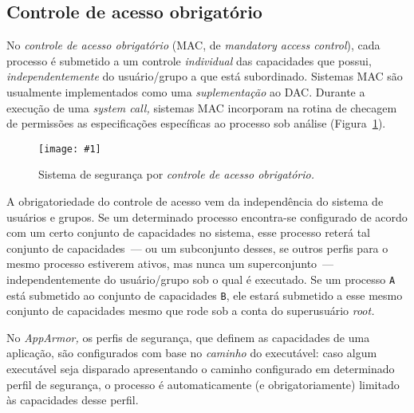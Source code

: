 \documentclass[ruledheader, 12pt]{abnt}
\newcommand{\figcustom}[4]{\par
	\begin{figure}[#3]
		\centering
		\texttt{[image: \#1]}
		\caption{\label{fig:#1}#2}
	\end{figure}
\par}
\newcommand{\figref}[1]{(Figura~\ref{fig:#1})}
\begin{document}
\subsection{Controle de acesso obrigatório}


No \emph{controle de acesso obrigatório} (MAC, de \emph{mandatory access control}), cada processo é submetido a um controle \emph{individual} das capacidades que possui, \emph{independentemente} do usuário/grupo a que está subordinado. Sistemas MAC são usualmente implementados como uma \emph{suplementação} ao DAC. Durante a execução de uma \emph{system call,} sistemas MAC incorporam na rotina de checagem de permissões as especificações específicas ao processo sob análise \figref{syscalls-mac}.

\figcustom{syscalls-mac}{Sistema de segurança por \emph{controle de acesso obrigatório.}}{tp}{.8}

A obrigatoriedade do controle de acesso vem da independência do sistema de usuários e grupos. Se um determinado processo encontra-se configurado de acordo com um certo conjunto de capacidades no sistema, esse processo reterá tal conjunto de capacidades~--- ou um subconjunto desses, se outros perfis para o mesmo processo estiverem ativos, mas nunca um superconjunto~--- independentemente do usuário/grupo sob o qual é executado. Se um processo \verb|A| está submetido ao conjunto de capacidades \verb|B|, ele estará submetido a esse mesmo conjunto de capacidades mesmo que rode sob a conta do superusuário \emph{root.}

No \emph{AppArmor,} os perfis de segurança, que definem as capacidades de uma aplicação, são configurados com base no \emph{caminho} do executável: caso algum executável seja disparado apresentando o caminho configurado em determinado perfil de segurança, o processo é automaticamente (e obrigatoriamente) limitado às capacidades desse perfil.
\end{document}
